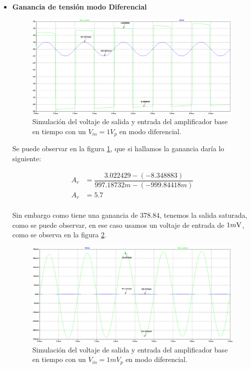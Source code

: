 \begin{enumerate}
\begin{itemize}
          \item \textbf{Ganancia de tensión modo Diferencial}
                \begin{figure}[H]
                  \centering
                  \includegraphics[width=\textwidth]{Imagenes/sim_base_1.png}
                  \caption{Simulación del voltaje de salida y entrada del amplificador base en tiempo con un $V_{in}=1V_p$ en modo diferencial.}
                  \label{fig:sim_base_1}
                \end{figure}

                Se puede observar en la figura \ref{fig:sim_base_1}, que si hallamos la ganancia daría lo siguiente:

                \begin{align*}
                  A_v & =\dfrac{3.022429-(-8.348883)}{997.18732m-(-999.84418m)} \\[0.2cm]
                  A_v & =5.7                                                    \\[0.2cm]
                \end{align*}

                Sin embargo como tiene una ganancia de 378.84, tenemos la salida saturada, como se puede observar, en ese caso usamos un voltaje de entrada de $1m\volt$, como se observa en la figura \ref{fig:sim_base_1m}.

                \begin{figure}[H]
                  \centering
                  \includegraphics[width=\textwidth]{Imagenes/sim_base_1m.png}
                  \caption{Simulación del voltaje de salida y entrada del amplificador base en tiempo con un $V_{in}=1mV_p$ en modo diferencial.}
                  \label{fig:sim_base_1m}
                \end{figure}


\end{itemize}
\end{enumerate}
